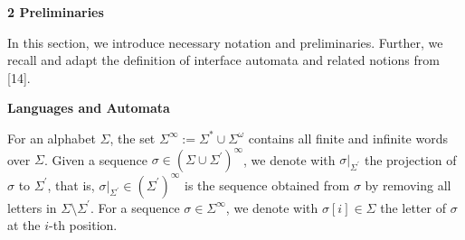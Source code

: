
 
\par\medskip\noindent\textbf{2 Preliminaries}\par
 
 
In this section, we introduce necessary notation and preliminaries. Further, we recall and adapt the definition of interface automata and related notions from [14].\par
 
 
 
\par\medskip\noindent\textbf{Languages and Automata}\par
 
 
For an alphabet $\Sigma$, the set $\Sigma^{\infty}:=\Sigma^{*}\cup\Sigma^{\omega}$ contains all finite and infinite words over $\Sigma$. Given a sequence $\sigma\in(\Sigma\cup\Sigma^{\prime})^{\infty}$, we denote with $\sigma|_{\Sigma^{\prime}}$ the projection of $\sigma$ to $\Sigma^{\prime}$, that is, $\sigma|_{\Sigma^{\prime}}\in(\Sigma^{\prime})^{\infty}$ is the sequence obtained from $\sigma$ by removing all letters in $\Sigma\setminus\Sigma^{\prime}$. For a sequence $\sigma\in\Sigma^{\infty}$, we denote with $\sigma[i]\in\Sigma$ the letter of $\sigma$ at the $i$-th position.\par
 
 
 
